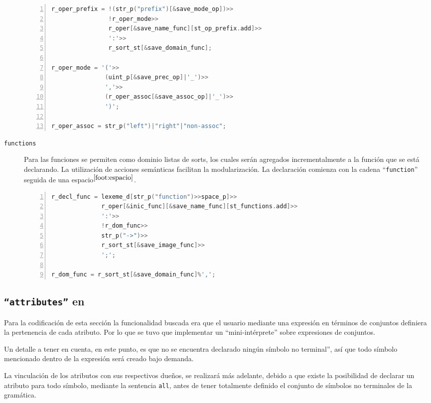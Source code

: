 \begin{description}
\begin{lstlisting}[language=C++, basicstyle=\scriptsize, numbers=left, numbersep=5pt, numberstyle=\tiny]
r_oper_prefix = !(str_p("prefix")[&save_mode_op])>>
                !r_oper_mode>>
                r_oper[&save_name_func][st_op_prefix.add]>>
                ':'>>
                r_sort_st[&save_domain_func];

r_oper_mode = '('>>
               (uint_p[&save_prec_op]|'_')>>
               ','>>
               (r_oper_assoc[&save_assoc_op]|'_')>>
               ')';

r_oper_assoc = str_p("left")|"right"|"non-assoc";
\end{lstlisting}

\item [\texttt{functions}] Para las funciones se permiten como dominio listas de sorts, los cuales serán agregados incrementalmente a la función que se está declarando. La utilización de acciones semánticas facilitan la modularización. La declaración comienza con la cadena ``\texttt{function}'' seguida de una espacio$^{\ref{foot:espacio}}$.

\begin{lstlisting}[language=C++, basicstyle=\scriptsize, numbers=left, numbersep=5pt, numberstyle=\tiny]
r_decl_func = lexeme_d[str_p("function")>>space_p]>>
              r_oper[&inic_func][&save_name_func][st_functions.add]>>
              ':'>>
              !r_dom_func>>
              str_p("->")>>
              r_sort_st[&save_image_func]>>
              ';';

r_dom_func = r_sort_st[&save_domain_func]%',';
\end{lstlisting}
\end{description}

\subsection{\texttt{``attributes''} en \spirit }

Para la codificación de esta sección la funcionalidad buscada era que el usuario mediante una expresión en términos de conjuntos definiera la pertenencia de cada atributo. Por lo que se tuvo que implementar un ``mini-intérprete'' sobre expresiones de conjuntos.

Un detalle a tener en cuenta, en este punto, es que no se encuentra declarado ningún símbolo no terminal'', así que todo símbolo mencionado dentro de la expresión será creado bajo demanda.

La vinculación de los atributos con sus respectivos dueños, se realizará más adelante, debido a que existe la posibilidad de declarar un atributo para todo símbolo, mediante la sentencia \texttt{all}, antes de tener totalmente definido el conjunto de símbolos no terminales de la gramática.

